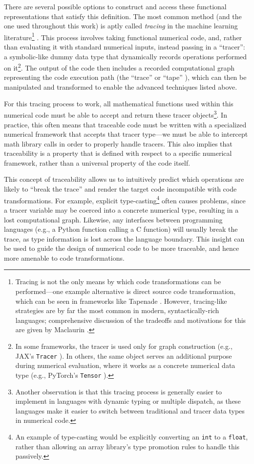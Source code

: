 There are several possible options to construct and access these functional representations that satisfy this definition. The most common method (and the one used throughout this work) is aptly called \emph{tracing} in the machine learning literature\footnote{Tracing is not the only means by which code transformations can be performed—one example alternative is direct source code transformation, which can be seen in frameworks like Tapenade \cite{tapenade}. However, tracing-like strategies are by far the most common in modern, syntactically-rich languages; comprehensive discussion of the tradeoffs and motivations for this are given by Maclaurin \cite{maclaurin_modeling_2016}.} \cite{jax, frostig_compiling_2018, baydin_automatic_2018}. This process involves taking functional numerical code, and, rather than evaluating it with standard numerical inputs, instead passing in a ``tracer'': a symbolic-like dummy data type that dynamically records operations performed on it\footnote{In some frameworks, the tracer is used only for graph construction (e.g., JAX's \texttt{Tracer} \cite{jax}). In others, the same object serves an additional purpose during numerical evaluation, where it works as a concrete numerical data type (e.g., PyTorch's \texttt{Tensor} \cite{paszke_pytorch_2019}).}. The output of the code then includes a recorded computational graph representing the code execution path (the ``trace'' or ``tape'' \cite{paszke_pytorch_2019}), which can then be manipulated and transformed to enable the advanced techniques listed above.

For this tracing process to work, all mathematical functions used within this numerical code must be able to accept and return these tracer objects\footnote{Another observation is that this tracing process is generally easier to implement in languages with dynamic typing or multiple dispatch, as these languages make it easier to switch between traditional and tracer data types in numerical code.}. In practice, this often means that traceable code must be written with a specialized numerical framework that accepts that tracer type—we must be able to intercept math library calls in order to properly handle tracers. This also implies that traceability is a property that is defined with respect to a specific numerical framework, rather than a universal property of the code itself.

This concept of traceability allows us to intuitively predict which operations are likely to ``break the trace'' and render the target code incompatible with code transformations. For example, explicit type-casting\footnote{An example of type-casting would be explicitly converting an \texttt{int} to a \texttt{float}, rather than allowing an array library's type promotion rules to handle this passively.} often causes problems, since a tracer variable may be coerced into a concrete numerical type, resulting in a lost computational graph. Likewise, any interfaces between programming languages (e.g., a Python function calling a C function) will usually break the trace, as type information is lost across the language boundary. This insight can be used to guide the design of numerical code to be more traceable, and hence more amenable to code transformations.

